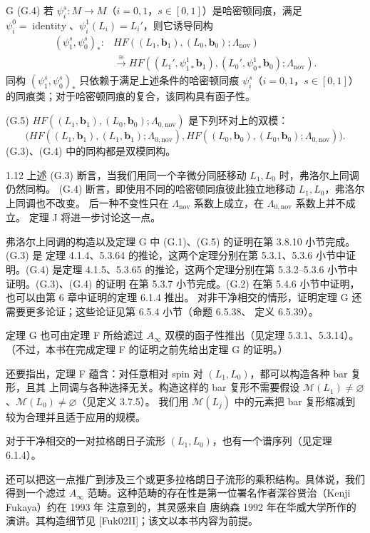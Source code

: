 \begin{theorem}{G}
\textup{(G.4)} 若
$\psi_i^s\colon M\to M$（$i=0,1$，$s\in[0,1]$）是哈密顿同痕，满足
$\psi_i^0=\operatorname{identity}$、$\psi_i^1(L_i)=L_i'$，则它诱导同构
\[
\begin{aligned}
  (\psi_1^s,\psi_0^s)_*\colon
  &HF((L_1,\mathbf b_1),(L_0,\mathbf b_0);\Lambda_{\mathrm{nov}})\\
  &\xrightarrow{\ \cong\ }
  HF((L_1',\psi_{1*}^1\mathbf b_1),(L_0',\psi_{0*}^1\mathbf b_0);\Lambda_{\mathrm{nov}}).
\end{aligned}
\]
同构 $(\psi_1^s,\psi_0^s)_*$ 只依赖于满足上述条件的哈密顿同痕
$\psi_i^s$（$i=0,1$，$s\in[0,1]$）的同痕类；对于哈密顿同痕的复合，该同构具有函子性。

\textup{(G.5)} $HF((L_1,\mathbf b_1),(L_0,\mathbf b_0);\Lambda_{0,\mathrm{nov}})$ 是下列环对上的双模：
\[
  \bigl(
    HF((L_1,\mathbf b_1),(L_1,\mathbf b_1);\Lambda_{0,\mathrm{nov}}),
    HF((L_0,\mathbf b_0),(L_0,\mathbf b_0);\Lambda_{0,\mathrm{nov}})
  \bigr).
\]
(G.3)、(G.4) 中的同构都是双模同构。
\end{theorem}

\begin{remark}{1.12}\label{rem:1-12}
上述 (G.3) 断言，当我们用同一个辛微分同胚移动 $L_1,L_0$ 时，弗洛尔上同调仍然同构。
(G.4) 断言，即使用不同的哈密顿同痕彼此独立地移动 $L_1,L_0$，弗洛尔上同调也不改变。
后一种不变性只在 $\Lambda_{\mathrm{nov}}$ 系数上成立，在 $\Lambda_{0,\mathrm{nov}}$ 系数上并不成立。
定理 J 将进一步讨论这一点。
\end{remark}

弗洛尔上同调的构造以及定理 G 中 (G.1)、(G.5) 的证明在第 3.8.10 小节完成。(G.3) 是
定理 4.1.4、5.3.64 的推论，这两个定理分别在第 5.3.1、5.3.6 小节中证明。(G.4) 是定理
4.1.5、5.3.65 的推论，这两个定理分别在第 5.3.2--5.3.6 小节中证明。(G.3)、(G.4) 的证明
在第 5.3.7 小节完成。(G.2) 在第 5.4.6 小节中证明，也可以由第 6 章中证明的定理 6.1.4 推出。
对非干净相交的情形，证明定理 G 还需要更多论证；这些论证见第 6.5.4 小节（命题 6.5.38、
定义 6.5.39）。

定理 G 也可由定理 F 所给滤过 $A_\infty$ 双模的函子性推出（见定理 5.3.1、5.3.14）。
（不过，本书在完成定理 F 的证明之前先给出定理 G 的证明。）

还要指出，定理 F 蕴含：对任意相对 spin 对 $(L_1,L_0)$，都可以构造各种 bar 复形，且其
上同调与各种选择无关。构造这样的 bar 复形不需要假设
$\mathcal M(L_1)\neq\varnothing$、$\mathcal M(L_0)\neq\varnothing$（见定义 3.7.5）。
我们用 $\mathcal M(L_j)$ 中的元素把 bar 复形缩减到较为合理并且适于应用的规模。

对于干净相交的一对拉格朗日子流形 $(L_1,L_0)$，也有一个谱序列（见定理 6.1.4）。

还可以把这一点推广到涉及三个或更多拉格朗日子流形的乘积结构。具体说，我们得到一个滤过
$A_\infty$ 范畴。这种范畴的存在性是第一位署名作者深谷贤治（Kenji Fukaya）约在 1993 年
注意到的，其灵感来自
唐纳森 1992 年在华威大学所作的演讲。其构造细节见
[Fuk02II]；该文以本书内容为前提。
